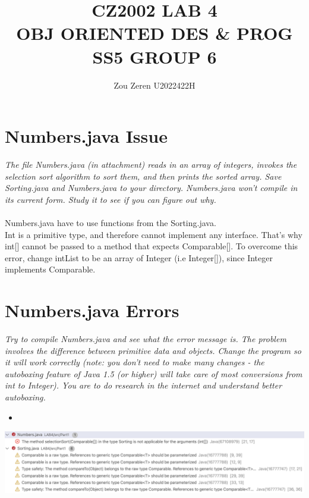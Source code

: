 \documentclass[hidelinks,12pt]{article}
\begin{document}
\title{CZ2002 LAB 4\\
\large OBJ ORIENTED DES \& PROG\\ SS5 GROUP 6}
\date{}
\author{Zou Zeren U2022422H\\}
\maketitle\thispagestyle{fancy}
\tableofcontents
\newpage

\section{Numbers.java Issue}
\textit{The file Numbers.java (in attachment) reads in an array of integers, invokes the selection sort
algorithm to sort them, and then prints the sorted array. Save Sorting.java and Numbers.java to your
directory. Numbers.java won't compile in its current form. Study it to see if you can figure out why.}
\\ \\ 
Numbers.java have to use functions from the Sorting.java.\\
Int is a primitive type, and therefore cannot implement any interface. That's why int[] cannot be passed to a method that expects Comparable[].
To overcome this error, change intList to be an array of Integer (i.e Integer[]), since Integer implements Comparable.
\section{Numbers.java Errors}
\textit{Try to compile Numbers.java and see what the error message is. The problem involves the difference
between primitive data and objects. Change the program so it will work correctly (note: you don't need
to make many changes - the autoboxing feature of Java 1.5 (or higher) will take care of most
conversions from int to Integer). You are to do research in the internet and understand better
autoboxing. }
\begin{itemize}
    \item[] 
\end{itemize}
\qquad\includegraphics[scale=0.4]{numbers_error.png} 
\end{document}
